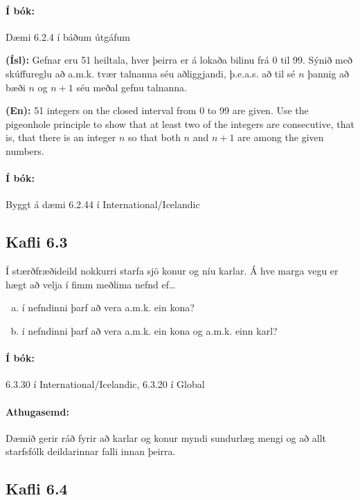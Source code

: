 \documentclass{article}
\begin{document}
\paragraph{Í bók:} Dæmi 6.2.4 í báðum útgáfum

\question 

\textbf{(Ísl):} Gefnar eru 51 heiltala, hver þeirra er á lokaða bilinu frá 0 til 99. Sýnið með skúffureglu að a.m.k. tvær talnanna séu aðliggjandi, þ.e.a.s. að til sé $n$ þannig að bæði $n$ og $n+1$ séu meðal gefnu talnanna.

\textbf{(En):} 51 integers on the closed interval from 0 to 99 are given. Use the pigeonhole principle to show that at least two of the integers are consecutive, that is, that there is an integer $n$ so that both $n$ and $n+1$ are among the given numbers.

\paragraph{Í bók:} Byggt á dæmi 6.2.44 í International/Icelandic

\subsection{Kafli 6.3}

\question

Í stærðfræðideild nokkurri starfa sjö konur og níu karlar. Á hve marga vegu er hægt að velja í fimm meðlima nefnd ef\ldots

\begin{enumerate}[a)]
    \item í nefndinni þarf að vera a.m.k. ein kona?
    \item í nefndinni þarf að vera a.m.k. ein kona og a.m.k. einn karl?
\end{enumerate}

\paragraph{Í bók:} 6.3.30 í International/Icelandic, 6.3.20 í Global

\paragraph{Athugasemd:} Dæmið gerir ráð fyrir að karlar og konur myndi sundurlæg mengi og að allt starfsfólk deildarinnar falli innan þeirra.

\subsection{Kafli 6.4}
\end{document}
